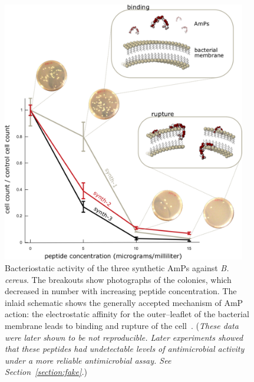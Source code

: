         \begin{figure}
        \centering
        \includegraphics[width=0.95\textwidth]{Body/Images-chap2/detailed-graph.pdf}
        \caption[Antimicrobial peptide action]{Bacteriostatic activity
        of the three synthetic AmPs against \emph{B. cereus}.
        The breakouts show photographs of the colonies, which
        decreased
        in number with increasing peptide concentration.  The inlaid
        schematic shows the generally accepted mechanism of AmP
        action: the electrostatic affinity for the outer--leaflet
        of the bacterial membrane leads to binding and rupture of
        the cell~\cite{shai2002mode}.
        (\emph{These data were later shown to be
    not reproducible.  Later experiments showed that 
    these
    peptides had undetectable levels of antimicrobial
    activity under a more reliable antimicrobial assay. See Section~\vref{section:fake}.})}
        \label{fig:graph2}
    \end{figure}


